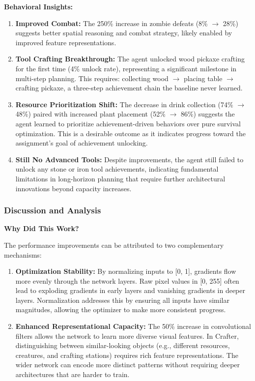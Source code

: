 \documentclass[twocolumn]{article}
\begin{document}
\textbf{Behavioral Insights:}

\begin{enumerate}
    \item \textbf{Improved Combat:} The 250\% increase in zombie defeats (8\% $\rightarrow$ 28\%) suggests better spatial reasoning and combat strategy, likely enabled by improved feature representations.
    
    \item \textbf{Tool Crafting Breakthrough:} The agent unlocked wood pickaxe crafting for the first time (4\% unlock rate), representing a significant milestone in multi-step planning. This requires: collecting wood $\rightarrow$ placing table $\rightarrow$ crafting pickaxe, a three-step achievement chain the baseline never learned.
    
    \item \textbf{Resource Prioritization Shift:} The decrease in drink collection (74\% $\rightarrow$ 48\%) paired with increased plant placement (52\% $\rightarrow$ 86\%) suggests the agent learned to prioritize achievement-driven behaviors over pure survival optimization. This is a desirable outcome as it indicates progress toward the assignment's goal of achievement unlocking.
    
    \item \textbf{Still No Advanced Tools:} Despite improvements, the agent still failed to unlock any stone or iron tool achievements, indicating fundamental limitations in long-horizon planning that require further architectural innovations beyond capacity increases.
\end{enumerate}

\subsubsection*{Discussion and Analysis}

\textbf{Why Did This Work?}

The performance improvements can be attributed to two complementary mechanisms:

\begin{enumerate}
    \item \textbf{Optimization Stability:} By normalizing inputs to [0, 1], gradients flow more evenly through the network layers. Raw pixel values in [0, 255] often lead to exploding gradients in early layers and vanishing gradients in deeper layers. Normalization addresses this by ensuring all inputs have similar magnitudes, allowing the optimizer to make more consistent progress.
    
    \item \textbf{Enhanced Representational Capacity:} The 50\% increase in convolutional filters allows the network to learn more diverse visual features. In Crafter, distinguishing between similar-looking objects (e.g., different resources, creatures, and crafting stations) requires rich feature representations. The wider network can encode more distinct patterns without requiring deeper architectures that are harder to train.
\end{enumerate}
\end{document}
